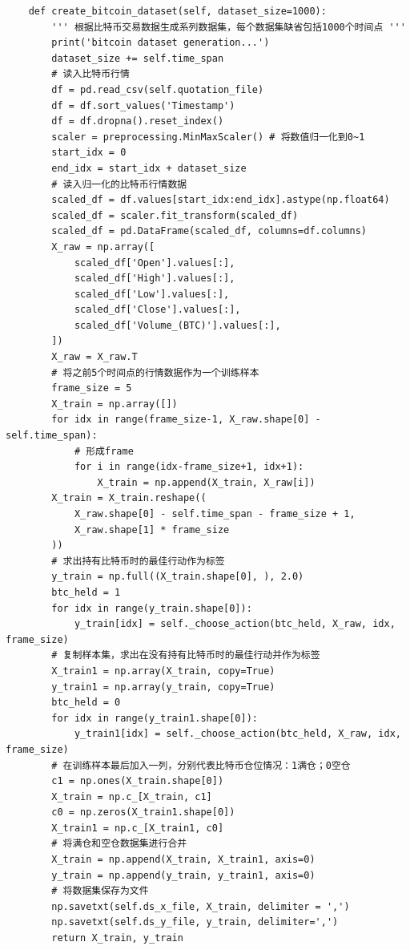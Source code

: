 \documentclass{article}
\begin{document}
\begin{lstlisting}
    def create_bitcoin_dataset(self, dataset_size=1000):
        ''' 根据比特币交易数据生成系列数据集，每个数据集缺省包括1000个时间点 '''
        print('bitcoin dataset generation...')
        dataset_size += self.time_span
        # 读入比特币行情
        df = pd.read_csv(self.quotation_file)
        df = df.sort_values('Timestamp')
        df = df.dropna().reset_index()
        scaler = preprocessing.MinMaxScaler() # 将数值归一化到0~1
        start_idx = 0
        end_idx = start_idx + dataset_size
        # 读入归一化的比特币行情数据
        scaled_df = df.values[start_idx:end_idx].astype(np.float64)
        scaled_df = scaler.fit_transform(scaled_df)
        scaled_df = pd.DataFrame(scaled_df, columns=df.columns)
        X_raw = np.array([
            scaled_df['Open'].values[:],
            scaled_df['High'].values[:],
            scaled_df['Low'].values[:],
            scaled_df['Close'].values[:],
            scaled_df['Volume_(BTC)'].values[:],
        ])
        X_raw = X_raw.T
        # 将之前5个时间点的行情数据作为一个训练样本
        frame_size = 5
        X_train = np.array([])
        for idx in range(frame_size-1, X_raw.shape[0] - self.time_span):
            # 形成frame
            for i in range(idx-frame_size+1, idx+1):
                X_train = np.append(X_train, X_raw[i])
        X_train = X_train.reshape((
            X_raw.shape[0] - self.time_span - frame_size + 1, 
            X_raw.shape[1] * frame_size
        ))
        # 求出持有比特币时的最佳行动作为标签
        y_train = np.full((X_train.shape[0], ), 2.0)
        btc_held = 1
        for idx in range(y_train.shape[0]):
            y_train[idx] = self._choose_action(btc_held, X_raw, idx, frame_size)
        # 复制样本集，求出在没有持有比特币时的最佳行动并作为标签
        X_train1 = np.array(X_train, copy=True)
        y_train1 = np.array(y_train, copy=True)
        btc_held = 0
        for idx in range(y_train1.shape[0]):
            y_train1[idx] = self._choose_action(btc_held, X_raw, idx, frame_size)
        # 在训练样本最后加入一列，分别代表比特币仓位情况：1满仓；0空仓
        c1 = np.ones(X_train.shape[0])
        X_train = np.c_[X_train, c1]
        c0 = np.zeros(X_train1.shape[0])
        X_train1 = np.c_[X_train1, c0]
        # 将满仓和空仓数据集进行合并
        X_train = np.append(X_train, X_train1, axis=0)
        y_train = np.append(y_train, y_train1, axis=0)
        # 将数据集保存为文件
        np.savetxt(self.ds_x_file, X_train, delimiter = ',')
        np.savetxt(self.ds_y_file, y_train, delimiter=',')
        return X_train, y_train
\end{lstlisting}
\end{document}
